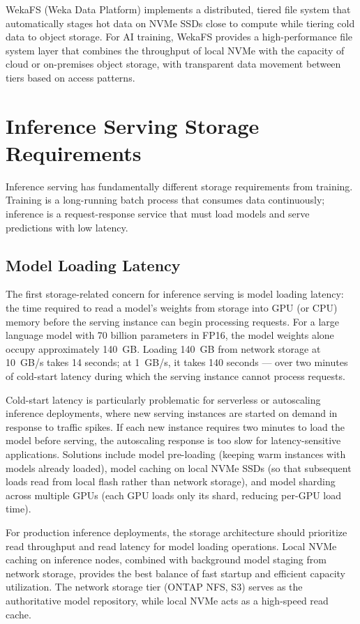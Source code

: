 WekaFS (Weka Data Platform) implements a distributed, tiered file system that
automatically stages hot data on NVMe SSDs close to compute while tiering
cold data to object storage. For AI training, WekaFS provides a
high-performance file system layer that combines the throughput of local NVMe
with the capacity of cloud or on-premises object storage, with transparent
data movement between tiers based on access patterns.

\section{Inference Serving Storage Requirements}

Inference serving has fundamentally different storage requirements from
training. Training is a long-running batch process that consumes data
continuously; inference is a request-response service that must load models
and serve predictions with low latency.

\subsection{Model Loading Latency}

The first storage-related concern for inference serving is model loading
latency: the time required to read a model's weights from storage into GPU (or
CPU) memory before the serving instance can begin processing requests. For a
large language model with 70 billion parameters in FP16, the model weights
alone occupy approximately 140~GB. Loading 140~GB from network storage at
10~GB/s takes 14 seconds; at 1~GB/s, it takes 140 seconds --- over two
minutes of cold-start latency during which the serving instance cannot process
requests.

Cold-start latency is particularly problematic for serverless or autoscaling
inference deployments, where new serving instances are started on demand in
response to traffic spikes. If each new instance requires two minutes to load
the model before serving, the autoscaling response is too slow for
latency-sensitive applications. Solutions include model pre-loading (keeping
warm instances with models already loaded), model caching on local NVMe SSDs
(so that subsequent loads read from local flash rather than network storage),
and model sharding across multiple GPUs (each GPU loads only its shard,
reducing per-GPU load time).

For production inference deployments, the storage architecture should
prioritize read throughput and read latency for model loading operations.
Local NVMe caching on inference nodes, combined with background model staging
from network storage, provides the best balance of fast startup and efficient
capacity utilization. The network storage tier (ONTAP NFS, S3) serves as the
authoritative model repository, while local NVMe acts as a high-speed read
cache.

